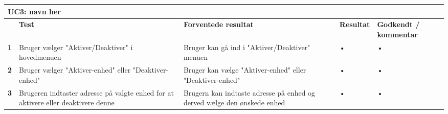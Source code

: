 
\begin{longtable}{|p{5mm}|p{40mm}|p{40mm}|p{20mm}|p{25mm}|}
\hline 
\multicolumn{5}{|l|}{\textbf{UC3: navn her}} \\ 
\hline 
& \textbf{Test} & \textbf{Forventede resultat} & \textbf{Resultat} & \textbf{Godkendt / kommentar} \\ 
\hline 
\textbf{1}& Bruger vælger "Aktiver/Deaktiver" i hovedmenuen & Bruger kan gå ind i "Aktiver/Deaktiver" menuen & • & • \\ 
\hline 
\textbf{2}& Bruger vælger "Aktiver-enhed" eller "Deaktiver-enhed" & Bruger kan vælge "Aktiver-enhed" eller "Deaktiver-enhed" & • & • \\ 
\hline 
\textbf{3}& Brugeren indtaster adresse på valgte enhed for at aktivere eller deaktivere denne & Brugern kan indtaste adresse på enhed og derved vælge den ønskede enhed & • & • \\ 
\hline 
\end{longtable} 